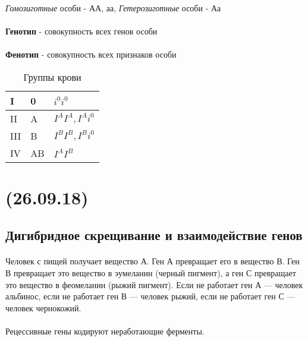 \documentclass[dvipdfmx]{article}
\begin{document}
\paragraph{}
\textit{Гомозиготные} особи - АА, аа, 
\textit{Гетерозиготные} особи - Аа

\paragraph{}
\textbf{Генотип} - совокупность всех генов особи
\paragraph{}
\textbf{Фенотип} - совокупность всех признаков особи


\begin{longtable}[c]{|p{1cm}|p{1cm}|p{2cm}|}
  \caption{Группы крови}\\
  \hline
  I   &  0  &  $i^0i^0$\\
  \hline
  II  &  A  &  $I^AI^A, I^Ai^0$\\
  \hline
  III &  B  &  $I^BI^B, I^Bi^0$\\
  \hline
  IV  &  AB &  $I^AI^B$\\
  \hline
\end{longtable}

\newpage
\noindent\makebox[\linewidth]{\rule{\paperwidth}{0.4pt}}
\section{(26.09.18)}
\noindent\makebox[\linewidth]{\rule{\paperwidth}{0.4pt}}

\subsection{Дигибридное скрещивание и взаимодействие генов}

\paragraph{}
Человек с пищей получает вещество А. Ген А превращает его в вещество В. Ген В превращает это вещество в эумеланин (черный пигмент), а ген С превращает это вещество в феомеланин (рыжий пигмент). Если не работает ген А --- человек
альбинос, если не работает ген В --- человек рыжий, если не работает ген С --- человек чернокожий.

\paragraph{}
Рецессивные гены кодируют неработающие ферменты.
\end{document}
